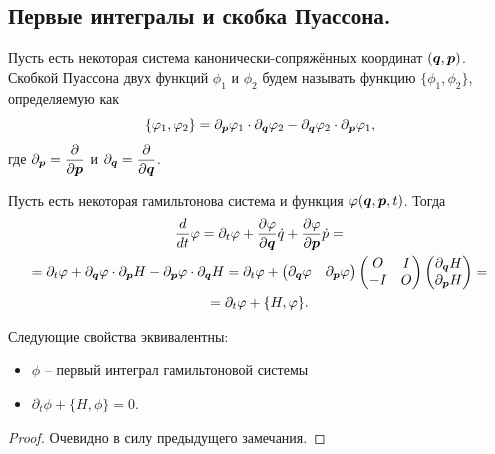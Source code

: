 \subsection{Первые интегралы и скобка Пуассона.}
\begin{definition}
    Пусть есть некоторая система канонически-сопряжённых координат $(\boldsymbol{q}, \boldsymbol{p})$.
    Скобкой Пуассона двух функций $\phi_1$ и $\phi_2$ будем называть функцию $\{\phi_1, \phi_2\}$, определяемую как
    \[
        \{\varphi_1, \varphi_2\} = \partial_{\boldsymbol{p}} \varphi_1 \cdot \partial_{\boldsymbol{q}} \varphi_2 - \partial_{\boldsymbol{q}} \varphi_2 \cdot \partial_{\boldsymbol{p}} \varphi_1,
    \]
    где $\partial_{\boldsymbol{p}} = \dfrac{\partial}{\partial \boldsymbol{p}}$ и $\partial_{\boldsymbol{q}} = \dfrac{\partial}{\partial \boldsymbol{q}}$.
\end{definition}
\begin{note}
    Пусть есть некоторая гамильтонова система и функция $\varphi(\boldsymbol{q}, \boldsymbol{p}, t)$. Тогда
    \begin{multline*}
        \dfrac{d}{dt}\phi = \partial_t \phi + \dfrac{\partial \phi}{\partial \bt{q}} \dot{q} + \dfrac{\partial \phi}{\partial \bt{p}} \dot{p} = \\ = \partial_t \phi + \partial_{\bt{q}}\phi \cdot \partial_{\bt{p}} H - \partial_{\bt{p}} \phi \cdot \partial_{\bt{q}} H = \partial_t \phi + \begin{pmatrix*} \partial_{\bt{q}} \phi & \partial_{\bt{p}} \phi
        \end{pmatrix*} \begin{pmatrix*} O & I \\ -I & O \end{pmatrix*} \begin{pmatrix*} \partial_{\bt{q}} H \\ \partial_{\bt{p}} H
        \end{pmatrix*} = \\ = \partial_t \phi + \{H, \phi\}.
    \end{multline*}
\end{note}
\begin{theorem}
    Следующие свойства эквивалентны:
    \begin{itemize}
        \item $\phi$ -- первый интеграл гамильтоновой системы
        \item $\partial_t \phi + \{H, \phi\} = 0$.
    \end{itemize}
\end{theorem}
\begin{proof}
    Очевидно в силу предыдущего замечания.
\end{proof}
